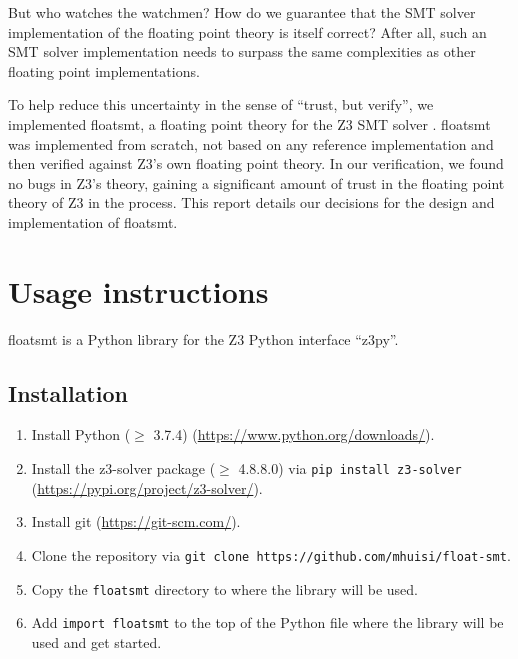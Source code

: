 \documentclass[a4paper,UKenglish,cleveref, autoref, thm-restate]{lipics-v2019}
\begin{document}
But who watches the watchmen? How do we guarantee that the SMT solver implementation of the floating point theory is itself correct? After all, such an SMT solver implementation needs to surpass the same complexities as other floating point implementations.

To help reduce this uncertainty in the sense of ``trust, but verify'', we implemented floatsmt, a floating point theory for the Z3 SMT solver \cite{z3}. floatsmt was implemented from scratch, not based on any reference implementation and then verified against Z3's own floating point theory. In our verification, we found no bugs in Z3's theory, gaining a significant amount of trust in the floating point theory of Z3 in the process. This report details our decisions for the design and implementation of floatsmt.

\section{Usage instructions}
floatsmt is a Python library for the Z3 Python interface ``z3py''.

\subsection{Installation}
\begin{enumerate}
\item Install Python ($\geq$ 3.7.4) (\url{https://www.python.org/downloads/}).
\item Install the z3-solver package ($\geq$ 4.8.8.0) via \verb|pip install z3-solver| (\url{https://pypi.org/project/z3-solver/}).
\item Install git (\url{https://git-scm.com/}).
\item Clone the repository via \verb|git clone https://github.com/mhuisi/float-smt|.
\item Copy the \verb|floatsmt| directory to where the library will be used.
\item Add \verb|import floatsmt| to the top of the Python file where the library will be used and get started.
\end{enumerate} 
\end{document}
